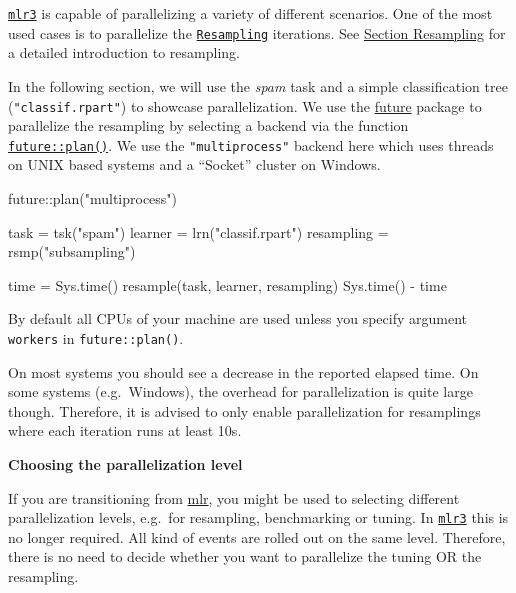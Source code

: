 \documentclass[]{article}
\makeatletter
\newenvironment{Shaded}{}{}
\newcommand{\KeywordTok}[1]{\textcolor[rgb]{0.00,0.00,1.00}{#1}}
\newcommand{\NormalTok}[1]{#1}
\newcommand{\OperatorTok}[1]{#1}
\newcommand{\StringTok}[1]{\textcolor[rgb]{0.00,0.50,0.50}{#1}}
\newenvironment{kframe}{%
\medskip{}
\setlength{\fboxsep}{.8em}
 \def\at@end@of@kframe{}%
 \ifinner\ifhmode%
  \def\at@end@of@kframe{\end{minipage}}%
  \begin{minipage}{\columnwidth}%
 \fi\fi%
 \def\FrameCommand##1{\hskip\@totalleftmargin \hskip-\fboxsep
 \colorbox{shadecolor}{##1}\hskip-\fboxsep
     \hskip-\linewidth \hskip-\@totalleftmargin \hskip\columnwidth}%
 \MakeFramed {\advance\hsize-\width
   \@totalleftmargin\z@ \linewidth\hsize
   \@setminipage}}%
 {\par\unskip\endMakeFramed%
 \at@end@of@kframe}
\newenvironment{rmdblock}[1]
  {
  \begin{itemize}
  \renewcommand{\labelitemi}{
    \raisebox{-.7\height}[0pt][0pt]{
      {\setkeys{Gin}{width=3em,keepaspectratio}\texttt{[image: images/\#1]}}
    }
  }
  \setlength{\fboxsep}{1em}
  \begin{kframe}
  \item
  }
  {
  \end{kframe}
  \end{itemize}
  }
\newenvironment{caution}
  {\begin{rmdblock}{caution}}
  {\end{rmdblock}}
\renewenvironment{Shaded} {\begin{snugshade}\small} {\end{snugshade}}
\makeatother
\begin{document}
\href{https://github.com/mlr-org/mlr3}{\texttt{mlr3}} is capable of parallelizing a variety of different scenarios.
One of the most used cases is to parallelize the \href{https://mlr3.mlr-org.com/reference/Resampling.html}{\texttt{Resampling}} iterations.
See \protect\hyperlink{resampling}{Section Resampling} for a detailed introduction to resampling.

In the following section, we will use the \emph{spam} task and a simple classification tree (\texttt{"classif.rpart"}) to showcase parallelization.
We use the \href{https://cran.r-project.org/package=future}{future} package to parallelize the resampling by selecting a backend via the function \href{https://www.rdocumentation.org/packages/future/topics/plan}{\texttt{future::plan()}}.
We use the \texttt{"multiprocess"} backend here which uses threads on UNIX based systems and a ``Socket'' cluster on Windows.

\begin{Shaded}
\begin{Highlighting}[]
\NormalTok{future}\OperatorTok{::}\KeywordTok{plan}\NormalTok{(}\StringTok{"multiprocess"}\NormalTok{)}

\NormalTok{task =}\StringTok{ }\KeywordTok{tsk}\NormalTok{(}\StringTok{"spam"}\NormalTok{)}
\NormalTok{learner =}\StringTok{ }\KeywordTok{lrn}\NormalTok{(}\StringTok{"classif.rpart"}\NormalTok{)}
\NormalTok{resampling =}\StringTok{ }\KeywordTok{rsmp}\NormalTok{(}\StringTok{"subsampling"}\NormalTok{)}

\NormalTok{time =}\StringTok{ }\KeywordTok{Sys.time}\NormalTok{()}
\KeywordTok{resample}\NormalTok{(task, learner, resampling)}
\KeywordTok{Sys.time}\NormalTok{() }\OperatorTok{-}\StringTok{ }\NormalTok{time}
\end{Highlighting}
\end{Shaded}

\begin{caution}
By default all CPUs of your machine are used unless you specify argument
\texttt{workers} in \texttt{future::plan()}.
\end{caution}

On most systems you should see a decrease in the reported elapsed time.
On some systems (e.g.~Windows), the overhead for parallelization is quite large though.
Therefore, it is advised to only enable parallelization for resamplings where each iteration runs at least 10s.

\textbf{Choosing the parallelization level}

If you are transitioning from \href{https://cran.r-project.org/package=mlr}{mlr}, you might be used to selecting different parallelization levels, e.g.~for resampling, benchmarking or tuning.
In \href{https://github.com/mlr-org/mlr3}{\texttt{mlr3}} this is no longer required.
All kind of events are rolled out on the same level.
Therefore, there is no need to decide whether you want to parallelize the tuning OR the resampling.
\end{document}
